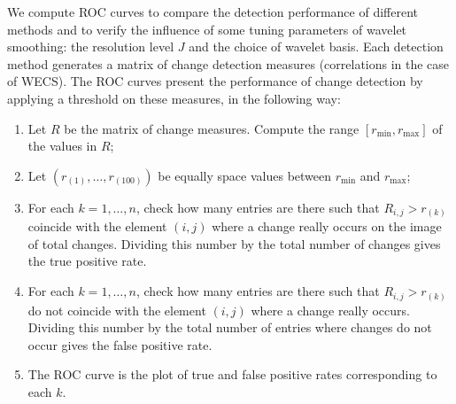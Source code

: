 \documentclass[journal]{IEEEtran}
\begin{document}
We compute ROC curves to compare the detection performance of different methods and to verify the influence of some tuning parameters of wavelet smoothing: the resolution level $J$ and the choice of wavelet basis. Each detection method generates a matrix of change detection measures (correlations in the case of WECS). The ROC curves present the performance of change detection by applying a threshold on these measures, in the following way:
\begin{enumerate}
\item Let $R$ be the matrix of change measures. Compute the range $[r_{\min},r_{\max}]$ of the values in $R$;
\item Let $(r_{(1)},\ldots,r_{(100)})$ be equally space values between $r_{\min}$ and $r_{\max}$;
\item For each $k=1,\ldots,n$, check how many entries are there such that $R_{i,j}>r_{(k)}$ coincide with the element $(i,j)$ where a change really occurs on the image of total changes. Dividing this number by the total number of changes gives the true positive rate.
\item For each $k=1,\ldots,n$, check how many entries are there such that $R_{i,j}>r_{(k)}$  do not coincide with the element $(i,j)$ where a change really occurs. Dividing this number by the total number of entries where changes do not occur gives the false positive rate.
\item The ROC curve is the plot of true and false positive rates corresponding to each $k$.
\end{enumerate}
\end{document}
